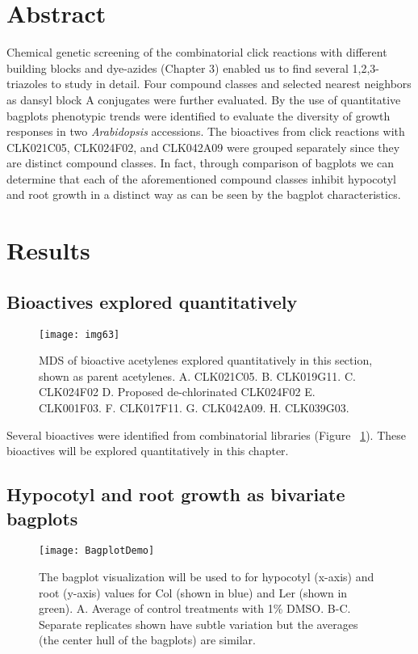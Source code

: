 \section{Abstract}

Chemical genetic screening of the combinatorial click reactions with different building blocks and dye-azides (Chapter 3) enabled us to find several 1,2,3-triazoles to study in detail. Four compound classes and selected nearest neighbors as dansyl block A conjugates were further evaluated. By the use of quantitative bagplots phenotypic trends were identified to evaluate the diversity of growth responses in two {\it Arabidopsis} accessions. The bioactives from click reactions with CLK021C05, CLK024F02, and CLK042A09 were grouped separately since they are distinct compound classes. In fact, through comparison of bagplots we can determine that each of the aforementioned compound classes inhibit hypocotyl and root growth in a distinct way as can be seen by the bagplot characteristics. 

\section{Results}

\subsection{Bioactives explored quantitatively}
\begin{figure}
\texttt{[image: img63]}
\caption{MDS of bioactive acetylenes explored quantitatively in this section, shown as parent acetylenes. A. CLK021C05. B. CLK019G11. C. CLK024F02 D. Proposed de-chlorinated CLK024F02 E. CLK001F03. F. CLK017F11. G. CLK042A09. H. CLK039G03.}
\label{fig:QuantitativePhenotypesPanelMDS}
\end{figure}

Several bioactives were identified from combinatorial libraries (Figure ~\ref{fig:QuantitativePhenotypesPanelMDS}). These bioactives will be explored quantitatively in this chapter. 

\subsection{Hypocotyl and root growth as bivariate bagplots}

\begin{figure}
\centering
\texttt{[image: BagplotDemo]}
\caption{The bagplot visualization will be used to for hypocotyl (x-axis) and root (y-axis) values for Col (shown in blue) and Ler (shown in green). A. Average of control treatments with 1{\%} DMSO. B-C. Separate replicates shown have subtle variation but the averages (the center hull of the bagplots) are similar.}
\label{fig:BagplotDemo}
\end{figure}

